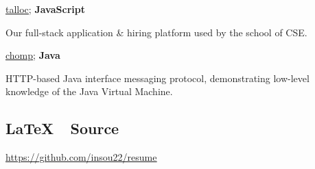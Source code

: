 \documentclass[a4paper]{deedy-resume}
\begin{document}
\begin{minipage}[t]{0.33\textwidth}
\vspace{6pt}

\href{https://cgi.cse.unsw.edu.au/~talloc/}
	{\underline{talloc}}; \textbf{ JavaScript}

Our full-stack application \& hiring platform
used by the school of CSE.

\vspace{6pt}

\href{https://github.com/insou22/chomp}
	{\underline{chomp}}; \textbf{ Java}

HTTP-based Java interface messaging protocol,
demonstrating low-level knowledge of the Java 
Virtual Machine.

\sectionspace


\vspace{0.3cm}
\subsection{\LaTeX \ \ Source}

\href{https://github.com/insou22/resume}
	{\underline{https://github.com/insou22/resume}}


\end{minipage}
\hfill
%
%
\end{document}
